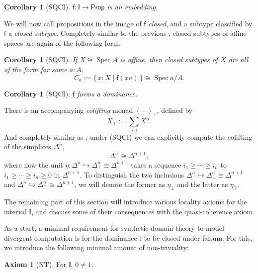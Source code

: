 \documentclass[12pt]{amsart}
\newtheorem{corollary}[theorem]{Corollary}
\theoremstyle{definition}
\newtheorem*{axiom}{Axiom}
\newcommand{\mbb}[1]{\mathbb{#1}}
\newcommand{\I}{\mbb I}
\newcommand{\ms}[1]{\mathsf{#1}}
\newcommand{\scomp}[2]{\{\,#1\mid#2\,\}}
\newcommand{\hook}{\hookrightarrow}
\newcommand{\prt}{_{\bot}}
\newcommand{\cprt}{_{\top}}
\newcommand{\emp}{\emptyset}
\newcommand{\pp}{\ms{Prop}}
\newcommand{\spec}{\operatorname{Spec}}
\begin{document}
\begin{corollary}[SQCI]
  $\ms f : \I \to \pp$ is an embedding.
\end{corollary}

We will now call propositions in the image of $\ms f$ \emph{closed}, and a subtype classified by $\ms f$ a \emph{closed subtype}. Completely similar to the previous , closed subtypes of affine spaces are again of the following form:

\begin{corollary}[SQCI]\label{cor:closedaffinealgebra}
  If $X \cong \spec A$ is affine, then closed subtypes of $X$ are all of the form for some $a:A$,
  \[ C_a := \scomp{x : X}{\ms f(xa)} \cong \spec a/A. \]
\end{corollary}

\begin{corollary}[SQCI]
  $\ms f$ forms a dominance.
\end{corollary}

There is an accompanying \emph{colifting} monad $(-)\cprt$, defined by
\[ X\cprt := \sum_{i:\I} X^{\ms fi}. \]
And completely similar as , under (SQCI) we can explicitly compute the colifting of the simplices $\Delta^n$,
\[ \Delta^n\cprt \cong \Delta^{n+1}, \]
where now the unit $\eta : \Delta^n \hook \Delta^n\cprt \cong \Delta^{n+1}$ takes a sequence $i_1 \ge \cdots \ge i_n$ to $i_1 \ge \cdots \ge i_n \ge 0$ in $\Delta^{n+1}$. To distinguish the two inclusions $\Delta^n \hook \Delta^n\prt \cong \Delta^{n+1}$ and $\Delta^n \hook \Delta^{n}\cprt \cong \Delta^{n+1}$, we will denote the former as $\eta\prt$ and the latter as $\eta\cprt$.

The remaining part of this section will introduce various locality axioms for the interval $\I$, and discuss some of their consequences with the quasi-coherence axiom.

As a start, a minimal requirement for synthetic domain theory to model divergent computation is for the dominance $\I$ to be closed under falsum. For this, we introduce the following minimal amount of non-triviality:

\begin{axiom}[NT]\label{ax:nt}
  For $\I$, $0 \neq 1$.
\end{axiom}

\end{document}
